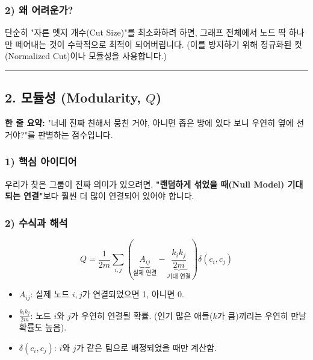 \documentclass[11pt,a4paper]{book}
\theoremstyle{definition}
\begin{document}
\subsubsection*{2) 왜 어려운가?}
단순히 "자른 엣지 개수(Cut Size)"를 최소화하려 하면, 그래프 전체에서 노드 딱 하나만 떼어내는 것이 수학적으로 최적이 되어버립니다. (이를 방지하기 위해 정규화된 컷(Normalized Cut)이나 모듈성을 사용합니다.)

\vspace{0.5cm}\hrule\vspace{0.5cm}

\subsection{2. 모듈성 (Modularity, $Q$)}


\begin{conceptbox}[title={개념 2: 우연을 가장한 필연 찾기}]
\textbf{한 줄 요약:} "너네 진짜 친해서 뭉친 거야, 아니면 좁은 방에 있다 보니 우연히 옆에 선 거야?"를 판별하는 점수입니다.
\end{conceptbox}

\subsubsection*{1) 핵심 아이디어}
우리가 찾은 그룹이 진짜 의미가 있으려면, \textbf{"랜덤하게 섞었을 때(Null Model) 기대되는 연결"}보다 훨씬 더 많이 연결되어 있어야 합니다.

\subsubsection*{2) 수식과 해석}
$$ Q = \frac{1}{2m} \sum_{i,j} \left( \underbrace{A_{ij}}_{\text{실제 연결}} - \underbrace{\frac{k_i k_j}{2m}}_{\text{기대 연결}} \right) \delta(c_i, c_j) $$
\begin{itemize}
    \item $A_{ij}$: 실제 노드 $i, j$가 연결되었으면 1, 아니면 0.
    \item $\frac{k_i k_j}{2m}$: 노드 $i$와 $j$가 우연히 연결될 확률. (인기 많은 애들($k$가 큼)끼리는 우연히 만날 확률도 높음).
    \item $\delta(c_i, c_j)$: $i$와 $j$가 같은 팀으로 배정되었을 때만 계산함.
\end{itemize}
\end{document}
